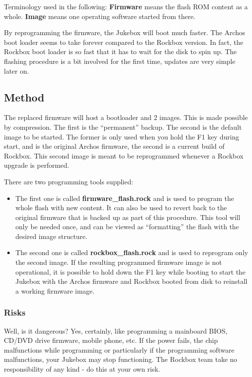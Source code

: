 Terminology used in the following:\newline
\textbf{Firmware} means the flash ROM content as a whole.\newline
\textbf{Image} means one operating software started from there. 

By reprogramming the firmware,  the Jukebox will boot much faster. The
Archos boot loader seems to take forever compared to the Rockbox
version. In fact, the Rockbox boot loader is so fast that it has to
wait for the disk to spin up.  The flashing procedure is a bit involved
for the first time, updates are very simple later on. 

\subsection{\label{ref:Method}Method}
The replaced firmware will host a bootloader and 2 images. This is made
possible by compression. The first is the
``permanent'' backup. The second is the
default image to be started.  The former is only used when you hold the
F1 key during start, and is the original Archos firmware, the second is
a current build of Rockbox. This second image is meant to be
reprogrammed whenever a Rockbox upgrade is performed.

There are two programming tools supplied: 

\begin{itemize}
\item The first one is called \textbf{firmware\_flash.rock} and is used
to program the whole flash with new content.  It can also be used to
revert back to the original firmware that is backed up as part of this
procedure.  This tool will only be needed once, and can be viewed as
``formatting'' the flash with the desired image structure. 
\item The second one is called \textbf{rockbox\_flash.rock }and is used
to reprogram only the second image. If the resulting programmed
firmware image is not operational, it is
possible to hold down the F1 key while booting to start the Jukebox
with the Archos firmware and Rockbox booted from disk to reinstall a
working firmware image. 
\end{itemize}

\subsubsection{\label{ref:PartISection63}Risks}
Well, is it dangerous? Yes, certainly, like programming a
mainboard BIOS, CD/DVD drive firmware,
mobile phone, etc. If the power fails, the chip malfunctions while
programming or particularly if the programming software malfunctions,
your Jukebox may stop functioning. The Rockbox team take no
responsibility of any kind {}- do this at your own risk. 

